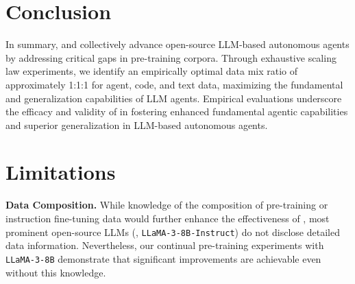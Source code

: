 \section{Conclusion}
\label{sec:conclusion}

In summary, \dataset and \method collectively advance open-source LLM-based autonomous agents by addressing critical gaps in pre-training corpora. 
Through exhaustive scaling law experiments, we identify an empirically optimal data mix ratio of approximately 1:1:1 for agent, code, and text data, maximizing the fundamental and generalization capabilities of LLM agents. 
Empirical evaluations underscore the efficacy and validity of \dataset in fostering enhanced fundamental agentic capabilities and superior generalization in LLM-based autonomous agents.






\section*{Limitations}
\noindent \textbf{Data Composition.} 
While knowledge of the composition of pre-training or instruction fine-tuning data would further enhance the effectiveness of \method, most prominent open-source LLMs (\eg, \texttt{LLaMA-3-8B-Instruct}) do not disclose detailed data information. Nevertheless, our continual pre-training experiments with \texttt{LLaMA-3-8B} demonstrate that significant improvements are achievable even without this knowledge. 

